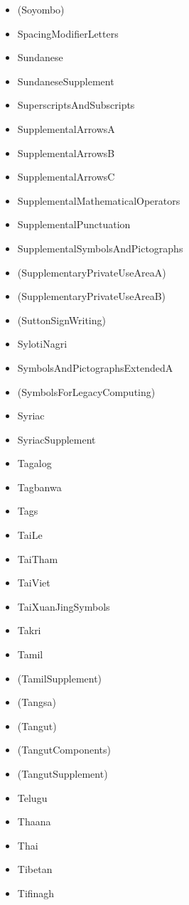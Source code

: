 \documentclass{article}
\newenvironment{itemlist}{%
  \begin{itemize}
  \setlength{\itemsep}{0pt}
  \setlength{\parsep}{0pt}
  \setlength{\topsep}{0pt}
  \setlength{\partopsep}{0pt}
  \setlength{\parskip}{0pt}
  \setlength{\labelsep}{5pt}}%
{
  \end{itemize}}
\begin{document}
\begin{multicols*}{2}
\begin{itemlist}
        \item (Soyombo)
        \item SpacingModifierLetters
        \item Sundanese
        \item SundaneseSupplement
        \item SuperscriptsAndSubscripts
        \item SupplementalArrowsA
        \item SupplementalArrowsB
        \item SupplementalArrowsC
        \item SupplementalMathematicalOperators
        \item SupplementalPunctuation
        \item SupplementalSymbolsAndPictographs
        \item (SupplementaryPrivateUseAreaA)
        \item (SupplementaryPrivateUseAreaB)
        \item (SuttonSignWriting)
        \item SylotiNagri
        \item SymbolsAndPictographsExtendedA
        \item (SymbolsForLegacyComputing)
        \item Syriac
        \item SyriacSupplement
        \item Tagalog
        \item Tagbanwa
        \item Tags
        \item TaiLe
        \item TaiTham
        \item TaiViet
        \item TaiXuanJingSymbols
        \item Takri
        \item Tamil
        \item (TamilSupplement)
        \item (Tangsa)
        \item (Tangut)
        \item (TangutComponents)
        \item (TangutSupplement)
        \item Telugu
        \item Thaana
        \item Thai
        \item Tibetan
        \item Tifinagh

\end{itemlist}
\end{multicols*}
\end{document}
